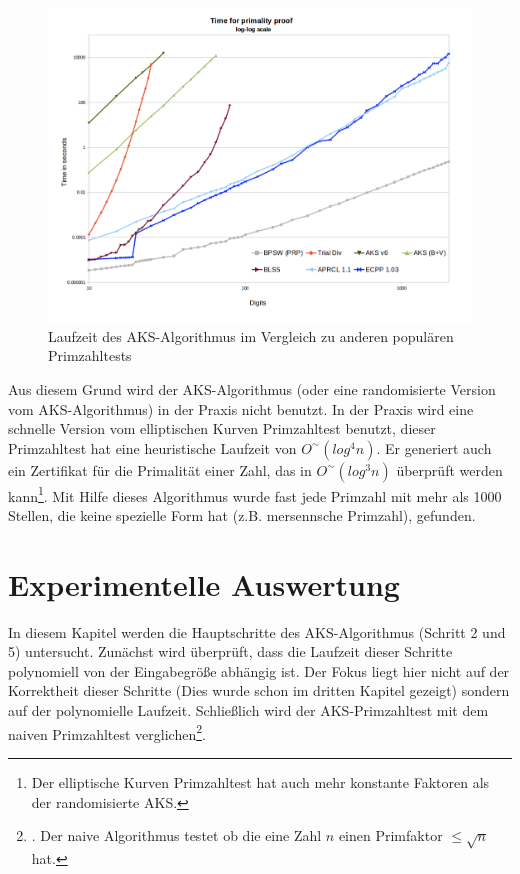 \documentclass[12pt,oneside]{article}
\theoremstyle{remark}
\theoremstyle{definition}
\begin{document}
\begin{figure}[h]
\includegraphics[width=13cm]{plots/Screenshot 2020-04-23 at 02.12.06.png}
\centering
\caption{\small{Laufzeit des AKS-Algorithmus im Vergleich zu anderen populären Primzahltests}}
\end{figure}
Aus diesem Grund wird der AKS-Algorithmus (oder eine randomisierte Version vom AKS-Algorithmus) in der Praxis nicht benutzt. In der Praxis wird eine schnelle Version vom elliptischen Kurven Primzahltest benutzt, dieser Primzahltest hat eine heuristische Laufzeit von $O^{\sim}(log^4 n)$. Er generiert auch ein Zertifikat für die Primalität einer Zahl, das in $O^{\sim}(log^3 n)$ überprüft werden kann\footnote{Der elliptische Kurven Primzahltest hat auch mehr konstante Faktoren als der randomisierte AKS.}. Mit Hilfe dieses Algorithmus wurde fast jede Primzahl mit mehr als 1000 Stellen, die keine spezielle Form hat (z.B. mersennsche Primzahl), gefunden\cite{mit_aks}.
\newpage

\section{Experimentelle Auswertung}
In diesem Kapitel werden die Hauptschritte des AKS-Algorithmus (Schritt 2 und 5) untersucht. Zunächst wird überprüft, dass die Laufzeit dieser Schritte polynomiell von der Eingabegröße abhängig ist. Der Fokus liegt hier nicht auf der Korrektheit dieser Schritte (Dies wurde schon im dritten Kapitel gezeigt) sondern auf der polynomielle Laufzeit. Schließlich wird der AKS-Primzahltest mit dem naiven Primzahltest verglichen\footnote{. Der naive Algorithmus testet ob die eine Zahl $n$ einen Primfaktor $\leq  \sqrt{n}$ hat.}. 
\end{document}
